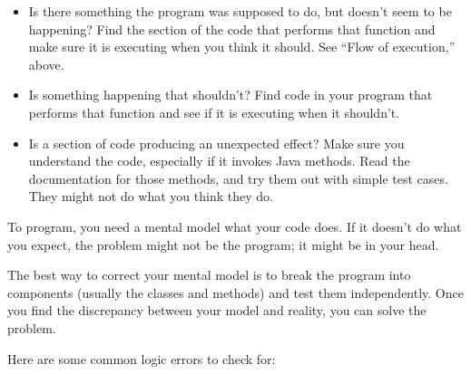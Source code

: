 \documentclass[12pt]{book}
\theoremstyle{definition}
\begin{document}
\begin{itemize}

\item Is there something the program was supposed to do, but
doesn't seem to be happening?  Find the section of the code
that performs that function and make sure it is executing when
you think it should.  See ``Flow of execution,'' above.

\item Is something happening that shouldn't?  Find code in
your program that performs that function and see if it is
executing when it shouldn't.

\item Is a section of code producing an unexpected effect?  Make sure
  you understand the code, especially if it invokes
  Java methods.  Read the documentation for those methods, and
  try them out with simple test cases.  They might not do what you
  think they do.

\end{itemize}

To program, you need a mental model what your code does.
If it doesn't do what you expect, the problem might not be
the program; it might be in your head.

The best way to correct your mental model is to break the program
into components (usually the classes and methods) and test
them independently.  Once you find the discrepancy
between your model and reality, you can solve the problem.

Here are some common logic errors to check for:
\end{document}
